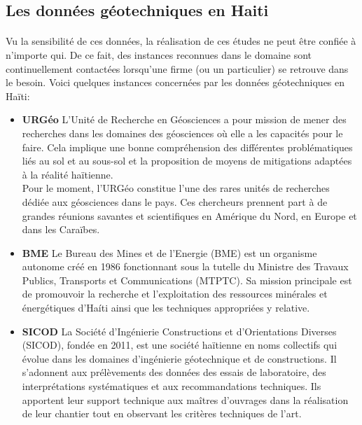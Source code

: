         \subsection{Les données géotechniques en Haiti}
       \paragraph{}
        Vu la sensibilité de ces données, la réalisation de ces études ne peut être confiée à n'importe qui. De ce 
        fait, des instances reconnues dans le domaine sont continuellement contactées 
        lorsqu'une firme (ou un particulier) se retrouve dans le besoin. Voici quelques instances concernées par les données géotechniques en Haïti:
        \begin{itemize}
            \item \textbf{URGéo}
        L'Unité de Recherche en Géosciences a pour mission de mener des recherches dans les
        domaines des géosciences où elle a les capacités pour le faire.
        Cela implique une bonne compréhension des différentes problématiques liés au sol et
        au sous-sol et la proposition de moyens de mitigations adaptées à la réalité haïtienne.
        \cite{mission_urgeo}
        \\
        Pour le moment, l’URGéo constitue l’une des rares unités de recherches dédiée aux
        géosciences dans le pays. 
        Ces chercheurs prennent part à de grandes réunions savantes et scientifiques en
        Amérique du Nord, en Europe et dans les Caraïbes.
        \cite{urgeo_nouvelliste}
            \item \textbf{BME}
        Le Bureau des Mines et de l’Energie (BME) est un organisme autonome créé en 
        1986 fonctionnant sous la tutelle du Ministre des Travaux Publics, Transports 
        et Communications (MTPTC). Sa mission principale est de promouvoir la recherche
        et l'exploitation des ressources minérales et énergétiques d'Haíti ainsi que les 
        techniques appropriées y relative.
            \item \textbf{SICOD}
        La  Société d’Ingénierie Constructions et d’Orientations Diverses (SICOD),
         fondée en 2011, est une société haïtienne en noms collectifs qui évolue dans les domaines d’ingénierie géotechnique et de constructions.
         Il s'adonnent aux prélèvements des données des essais de laboratoire, des interprétations systématiques et aux recommandations techniques. 
         Ils apportent leur support technique aux maîtres d'ouvrages dans la réalisation de leur chantier tout en observant les critères techniques de l'art.

\end{itemize}

